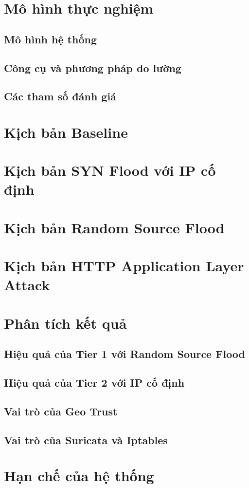 \documentclass[../DoAn.tex]{subfiles}
\begin{document}
\section{Mô hình thực nghiệm}

\subsection{Mô hình hệ thống}

\subsection{Công cụ và phương pháp đo lường}

\subsection{Các tham số đánh giá}

\section{Kịch bản Baseline}

\section{Kịch bản SYN Flood với IP cố định}

\section{Kịch bản Random Source Flood}

\section{Kịch bản HTTP Application Layer Attack}

\section{Phân tích kết quả}

\subsection{Hiệu quả của Tier 1 với Random Source Flood}

\subsection{Hiệu quả của Tier 2 với IP cố định}

\subsection{Vai trò của Geo Trust}

\subsection{Vai trò của Suricata và Iptables}

\section{Hạn chế của hệ thống}
\end{document}
